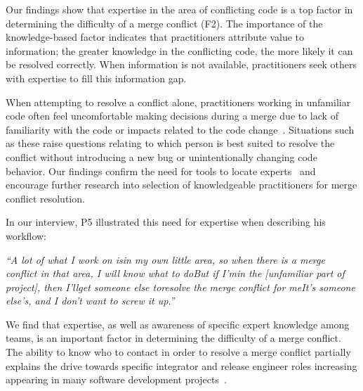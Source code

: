 \label{knowledge-based-factors}
Our findings show that expertise in the area of conflicting code is a top factor in determining the difficulty of a merge conflict (F2).
The importance of the knowledge-based factor indicates that practitioners attribute value to information; the greater knowledge in the conflicting code, the more likely it can be resolved correctly.
When information is not available, practitioners seek others with expertise to fill this information gap.

When attempting to resolve a conflict alone, practitioners working in unfamiliar code often feel uncomfortable making decisions during a merge due to lack of familiarity with the code or impacts related to the code change~\cite{CostaSarma}. 
Situations such as these raise questions relating to which person is best suited to resolve the conflict without introducing a new bug or unintentionally changing code behavior. 
Our findings confirm the need for tools to locate experts~\cite{CostaSarma} and encourage further research into selection of knowledgeable practitioners for merge conflict resolution.

In our interview, P5 illustrated this need for expertise when describing his workflow: 

\begin{displayquote}
	\textit{``A lot of what I work on is\textellipsis in my own little area, so when there is a merge conflict in that area, I will know what to do\textellipsis But if I'm\textellipsis in the [unfamiliar part of project], then I'll\textellipsis get someone else to\textellipsis resolve the merge conflict for me\textellipsis It's someone else's, and I don't want to screw it up.''}
\end{displayquote}

We find that expertise, as well as awareness of specific expert knowledge among teams, is an important factor in determining the difficulty of a merge conflict.
The ability to know who to contact in order to resolve a merge conflict partially explains the drive towards specific integrator and release engineer roles increasing appearing in many software development projects~\cite{adams_release_eng}.

